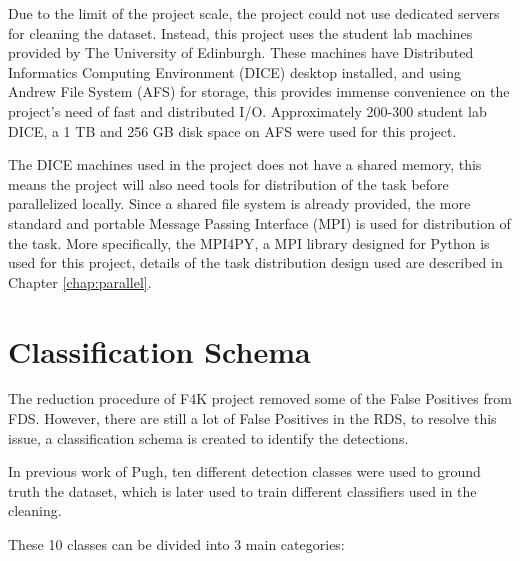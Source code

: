 \documentclass[bsc,logo,twoside,fullspacing,parskip]{infthesis}
\begin{document}
Due to the limit of the project scale, the project could not use dedicated servers for cleaning the dataset.
Instead, this project uses the student lab machines provided by The University of Edinburgh.
These machines have Distributed Informatics Computing Environment (DICE) desktop installed, and using Andrew File System (AFS) for storage, this provides immense convenience on the project's need of fast and distributed I/O.   
Approximately 200-300 student lab DICE, a 1 TB and 256 GB disk space on AFS were used for this project.

The DICE machines used in the project does not have a shared memory, this means the project will also need tools for distribution of the task before parallelized locally.
Since a shared file system is already provided, the more standard and portable Message Passing Interface (MPI) is used for distribution of the task. More specifically, the MPI4PY\cite{MPI4PY}, a MPI library designed for Python is used for this project, details of the task distribution design used are described in Chapter \ref{chap:parallel}.

\section{Classification Schema}
\label{sec:schema}

The reduction procedure of F4K project removed some of the False Positives from FDS. 
However, there are still a lot of False Positives in the RDS, to resolve this issue, a classification schema is created to identify the detections.

In previous work of Pugh\cite{Pugh}, ten different detection classes were used to ground truth the dataset, which is later used to train different classifiers used in the cleaning. 

These 10 classes can be divided into 3 main categories:

\renewcommand{\labelenumi}{\bfseries\Roman{enumi}}
\renewcommand{\labelenumii}{\bfseries\arabic{enumii}}
\renewcommand{\labelenumiii}{\bfseries\roman{enumiii}}
\end{document}
